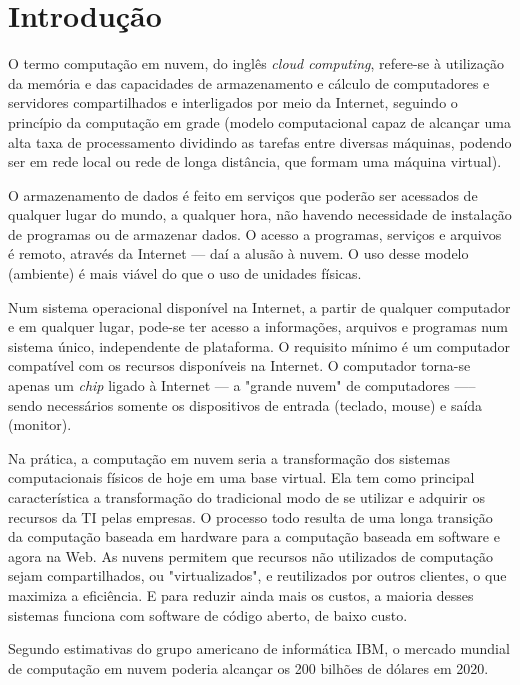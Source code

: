 \chapter{Introdução}

O termo computação em nuvem, do inglês \emph{cloud computing}, refere-se à
utilização da memória e das capacidades de armazenamento e cálculo de
computadores e servidores compartilhados e interligados por meio da Internet,
seguindo o princípio da computação em grade (modelo computacional capaz de
alcançar uma alta taxa de processamento dividindo as tarefas entre diversas
máquinas, podendo ser em rede local ou rede de longa distância, que formam uma
máquina virtual).

O armazenamento de dados é feito em serviços que poderão ser acessados de qualquer
lugar do mundo, a qualquer hora, não havendo necessidade de instalação de
programas ou de armazenar dados. O acesso a programas, serviços e arquivos é
remoto, através da Internet --- daí a alusão à nuvem. O uso desse modelo
(ambiente) é mais viável do que o uso de unidades físicas.

Num sistema operacional disponível na Internet, a partir de qualquer computador e em
qualquer lugar, pode-se ter acesso a informações, arquivos e programas num sistema
único, independente de plataforma. O requisito mínimo é um computador compatível
com os recursos disponíveis na Internet. O computador torna-se apenas um \emph{chip}
ligado à Internet — a "grande nuvem" de computadores —-- sendo necessários
somente os dispositivos de entrada (teclado, mouse) e saída (monitor).

Na prática, a computação em nuvem seria a transformação dos sistemas
computacionais físicos de hoje em uma base virtual. Ela tem como principal
característica a transformação do tradicional modo de se utilizar e adquirir os
recursos da TI pelas empresas. O processo todo resulta de uma longa transição da
computação baseada em hardware para a computação baseada em software e agora na
Web. As nuvens permitem que recursos não utilizados de computação sejam
compartilhados, ou "virtualizados", e reutilizados por outros clientes, o que
maximiza a eficiência. E para reduzir ainda mais os custos, a maioria desses
sistemas funciona com software de código aberto, de baixo custo.

Segundo estimativas do grupo americano de informática IBM, o mercado mundial de
computação em nuvem poderia alcançar os 200 bilhões de dólares em 2020.

